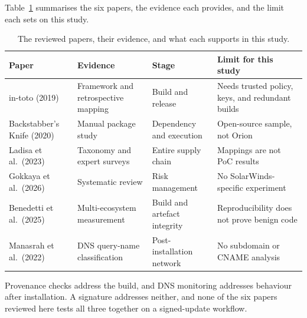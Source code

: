 Table~\ref{tab:papers} summarises the six papers, the evidence each provides, and the limit each sets on this study.

\begin{table}[H]
\centering
\footnotesize
{}
\caption{The reviewed papers, their evidence, and what each supports in this study.}
\label{tab:papers}
\begin{tabular}{@{}>{\RaggedRight}p{2.3cm}>{\RaggedRight}p{3.3cm}>{\RaggedRight}p{4.2cm}>{\RaggedRight}p{4.9cm}@{}}
\toprule
\textbf{Paper} & \textbf{Evidence} & \textbf{Stage} & \textbf{Limit for this study} \\
\midrule
in-toto (2019) & Framework and retrospective mapping & Build and release & Needs trusted policy, keys, and redundant builds \\
Backstabber's Knife (2020) & Manual package study & Dependency and execution & Open-source sample, not Orion \\
Ladisa et al.\ (2023) & Taxonomy and expert surveys & Entire supply chain & Mappings are not PoC results \\
Gokkaya et al.\ (2026) & Systematic review & Risk management & No SolarWinds-specific experiment \\
Benedetti et al.\ (2025) & Multi-ecosystem measurement & Build and artefact integrity & Reproducibility does not prove benign code \\
Manasrah et al.\ (2022) & DNS query-name classification & Post-installation network & No subdomain or CNAME analysis \\
\bottomrule
\end{tabular}
\end{table}

Provenance checks address the build, and DNS monitoring addresses behaviour after installation. A signature addresses neither, and none of the six papers reviewed here tests all three together on a signed-update workflow.
